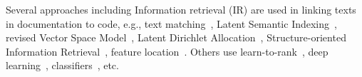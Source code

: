 Several approaches including Information retrieval (IR) are
used in linking texts in documentation to code, e.g., text
matching~\cite{bacchelli-icse10}, Latent Semantic
Indexing~\cite{marcus-icse03,delucia-ase08}, revised Vector Space
Model~\cite{buglocator-icse12,wang-icsm14}, Latent Dirichlet
Allocation~\cite{ase11,trase10}, Structure-oriented
Information Retrieval~\cite{saha-ase13,mcmillan11}, 
feature location~\cite{liu-ase07}.  Others use
learn-to-rank~\cite{ye-fse14}, deep learning~\cite{ase15-nier},
classifiers~\cite{kim-tse13}, etc. 
